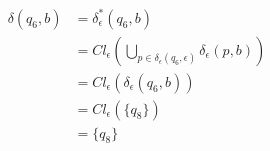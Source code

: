 \documentclass{article}
\begin{document}
\begin{enumerate}
{\begin{enumerate}
{					\begin{align*}
						\delta(q_{6}, b) &= \delta^{*}_{\epsilon}(q_{6}, b) \\
						&= Cl_{\epsilon}(\bigcup_{p \in \delta_{\epsilon}(q_{6}, \epsilon)}
						{\delta_{\epsilon}(p, b)}) \\
						&= Cl_{\epsilon}(\delta_{\epsilon}(q_{6}, b))\\
						&= Cl_{\epsilon}(\{q_{8}\})\\
						&= \{q_{8}\}
					\end{align*}

				}
    		\end{enumerate}
    	}
    \end{enumerate}
\end{document}
